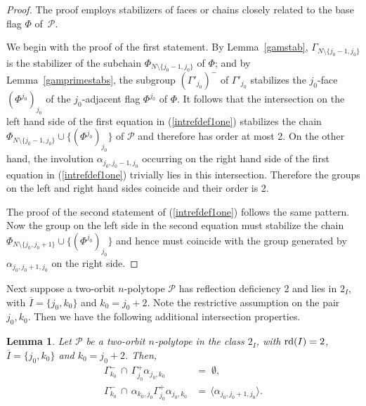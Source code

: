 \documentclass[12pt]{article}
\renewcommand{\bar}{\overline}
\renewcommand{\>}{\rangle}
\newtheorem{lemma}[theorem]{Lemma}
\theoremstyle{definition}\newtheorem{definition}{Definition}[section]
\begin{document}
\begin{proof}
The proof employs stabilizers of faces or chains closely related to the base flag $\Phi$ of~$\mathcal{P}$. 

We begin with the proof of the first statement. By Lemma~\ref{gamstab}, $\Gamma_{N\setminus\{j_{0}-1,j_{0}\}}$ is the stabilizer of the subchain $\Phi_{N\setminus\{j_{0}-1,j_{0}\}}$ of $\Phi$; and by Lemma~\ref{gamprimestabs}, the subgroup $(\Gamma'_{j_0})^{-}$ of $\Gamma'_{j_0}$ stabilizes the $j_{0}$-face $(\Phi^{j_0})_{j_0}$ of the $j_0$-adjacent flag $\Phi^{j_0}$ of $\Phi$. It follows that the intersection on the left hand side of the first equation in (\ref{intrefdef1one}) stabilizes the chain $\Phi_{N\setminus\{j_{0}-1,j_{0}\}}\cup\{(\Phi^{j_0})_{j_0}\}$ of $\mathcal{P}$ and therefore has order at most 2. On the other hand, the involution $\alpha_{j_{0},j_{0}-1,j_{0}}$ occurring on the right hand side of the first equation in (\ref{intrefdef1one}) trivially lies in this  intersection. Therefore the groups on the left and right hand sides coincide and their  order is 2.

The proof of the second statement of (\ref{intrefdef1one}) follows the same pattern. Now the group on the left side in the second equation must stabilize the chain $\Phi_{N\setminus\{j_{0},j_{0}+1\}}\cup\{(\Phi^{j_0})_{j_0}\}$ and hence must coincide with the group generated by $\alpha_{j_{0},j_{0}+1,j_{0}}$ on the right side.
\end{proof}
\smallskip

Next suppose a two-orbit $n$-polytope $\mathcal{P}$ has reflection deficiency 2 and lies in $2_I$, with $\bar{I}=\{j_0,k_0\}$ and $k_{0}=j_{0}+2$. Note the restrictive assumption on the pair $j_0,k_0$. Then we have the following additional intersection properties.

\begin{lemma}
\label{intrefdefnew}
Let $\mathcal{P}$ be a two-orbit $n$-polytope in the class $2_I$, with ${\rm rd}(I)=2$, $\bar{I}=\{j_0,k_0\}$ and $k_{0}=j_{0}+2$. Then, 
\begin{equation}
\label{intrefdef2}
\begin{array}{rl}
\Gamma_{k_0}^{-}\,\cap\,\Gamma_{j_0}^{+}\alpha_{j_0,k_0}\!\!\! &=\; \emptyset,\\[.08in]
\Gamma_{k_0}^{-}\,\cap\,\alpha_{k_0,j_0}\Gamma_{j_0}^{+}\alpha_{j_0,k_0} \!\!\!&=\, 
\langle \alpha_{j_0,j_{0}+1,j_{0}}\rangle.\\[.05in]
\end{array}
\end{equation}
\end{lemma}
\end{document}
